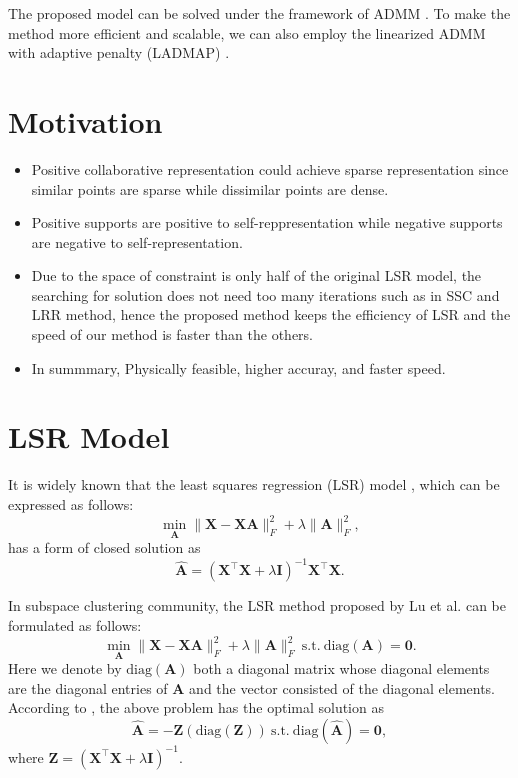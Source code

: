 \documentclass[10pt,twocolumn,letterpaper]{article}
\begin{document}
The proposed model can be solved under the framework of ADMM \cite{admm}. To make the method more efficient and scalable, we can also employ the linearized ADMM with adaptive penalty (LADMAP) \cite{ladmap}.


\section{Motivation}

\begin{itemize}
\item Positive collaborative representation could achieve sparse representation since similar points are sparse while dissimilar points are dense.

\item Positive supports are positive to self-reppresentation while negative supports are negative to self-representation.

\item Due to the space of constraint is only half of the original LSR model, the searching for solution does not need too many iterations such as in SSC and LRR method, hence the proposed method keeps the efficiency of LSR and the speed of our method is faster than the others.

\item In summmary, Physically feasible, higher accuray, and faster speed.
\end{itemize}

\section{LSR Model}
It is widely known that the least squares regression (LSR) model \cite{prml}, which can be expressed as follows:
\begin{equation}
\label{e1}
\min_{\bm{A}}
\|
\bm{X}
-
\bm{X}\bm{A}
\|_{F}^{2}
+
\lambda
\|
\bm{A}
\|_{F}^{2}
,
\end{equation}
has a form of closed solution as
\begin{equation}
\label{e2}
\hat{\bm{A}}
=
(\bm{X}^{\top}\bm{X}+\lambda\bm{I})^{-1}\bm{X}^{\top}\bm{X}.
\end{equation}


In subspace clustering community, the LSR method \cite{lsr} proposed by Lu et al. can be formulated as follows:
\begin{equation}
\label{e3}
\min_{\bm{A}}
\|
\bm{X}
-
\bm{X}\bm{A}
\|_{F}^{2}
+
\lambda
\|
\bm{A}
\|_{F}^{2}
\ 
\text{s.t.}
\ 
\text{diag}(\bm{A})=\bm{0}.
\end{equation}
Here we denote by $\text{diag}(\bm{A})$ both a diagonal matrix whose diagonal elements are the diagonal entries of $\bm{A}$ and the vector consisted of the diagonal elements. According to \cite{lsr}, the above problem has the optimal solution as 
\begin{equation}
\label{e4}
\hat{\bm{A}}
=
-\bm{\bm{Z}}(\text{diag}(\bm{Z}))
\
\text{s.t.} 
\
\text{diag}(\hat{\bm{A}})=\bm{0}
,
\end{equation}
where $\bm{Z}=(\bm{X}^{\top}\bm{X}+\lambda\bm{I})^{-1}$.
\end{document}
